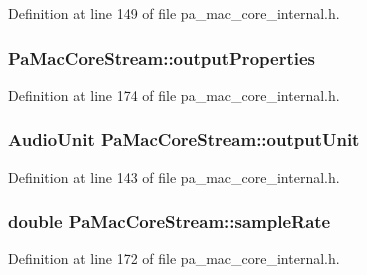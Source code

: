 Definition at line 149 of file pa\+\_\+mac\+\_\+core\+\_\+internal.\+h.

\subsubsection[{\texorpdfstring{output\+Properties}{outputProperties}}]{ Pa\+Mac\+Core\+Stream\+::output\+Properties}\hypertarget{struct_pa_mac_core_stream_a7d1be4951510dd36b84abd1cc7daf49a}{}\label{struct_pa_mac_core_stream_a7d1be4951510dd36b84abd1cc7daf49a}


Definition at line 174 of file pa\+\_\+mac\+\_\+core\+\_\+internal.\+h.

\subsubsection[{\texorpdfstring{output\+Unit}{outputUnit}}]{\setlength{\rightskip}{0pt plus 5cm}Audio\+Unit Pa\+Mac\+Core\+Stream\+::output\+Unit}\hypertarget{struct_pa_mac_core_stream_a834e659582a0b68100a0095ac6d45c7e}{}\label{struct_pa_mac_core_stream_a834e659582a0b68100a0095ac6d45c7e}


Definition at line 143 of file pa\+\_\+mac\+\_\+core\+\_\+internal.\+h.

\subsubsection[{\texorpdfstring{sample\+Rate}{sampleRate}}]{\setlength{\rightskip}{0pt plus 5cm}double Pa\+Mac\+Core\+Stream\+::sample\+Rate}\hypertarget{struct_pa_mac_core_stream_a3e945d299bff5c01d6e8a4f6bd8dfffb}{}\label{struct_pa_mac_core_stream_a3e945d299bff5c01d6e8a4f6bd8dfffb}


Definition at line 172 of file pa\+\_\+mac\+\_\+core\+\_\+internal.\+h.

